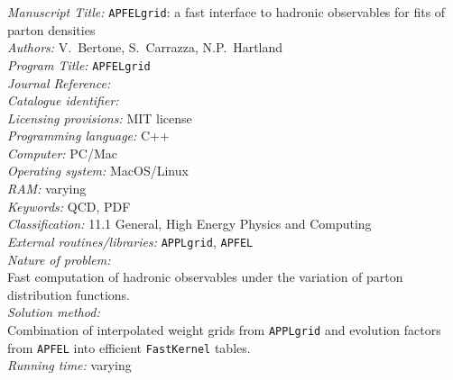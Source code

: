 \documentclass[preprint,12pt]{elsarticle}
\newcounter{bla}
\begin{document}
\begin{small}
\noindent
{\em Manuscript Title:} {\tt APFELgrid}: a fast interface to hadronic observables for
  fits of parton densities                                      \\
{\em Authors:} V.~Bertone, S.~Carrazza, N.P.~Hartland                                               \\
{\em Program Title:} {\tt APFELgrid}                                          \\
{\em Journal Reference:}                                      \\
{\em Catalogue identifier:}                                   \\
{\em Licensing provisions:}   MIT license                                \\
{\em Programming language:}  C++                                 \\
{\em Computer:} PC/Mac                                               \\
{\em Operating system:} MacOS/Linux                                       \\
{\em RAM:} varying                                              \\
{\em Keywords:} QCD, PDF\\
{\em Classification:}  11.1 General, High Energy Physics and Computing                                       \\
{\em External routines/libraries:}  {\tt APPLgrid}, {\tt APFEL}                          \\
{\em Nature of problem:}\\
 Fast computation of hadronic observables under the variation of parton distribution functions.
   \\
{\em Solution method:}\\
  Combination of interpolated weight grids from {\tt APPLgrid} and evolution factors from {\tt APFEL} into efficient {\tt FastKernel} tables.\\
{\em Running time:} varying\\
   \\
\end{small}
\end{document}
